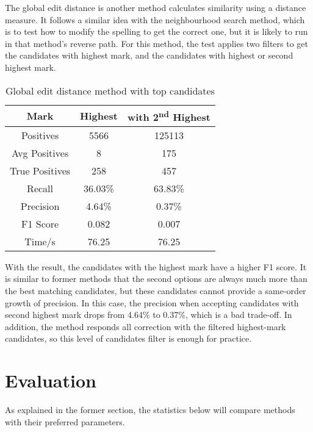 \documentclass[11pt]{article}
\begin{document}
The global edit distance is another method calculates similarity using a distance measure. It follows a similar idea with the neighbourhood search method, which is to test how to modify the spelling to get the correct one, but it is likely to run in that method's reverse path. For this method, the test applies two filters to get the candidates with highest mark, and the candidates with highest or second highest mark.

\begin{table}[h]
 \begin{center}
\begin{tabular}{ |c||c|c| }
      \hline
      Mark & Highest & with 2\textsuperscript{nd} Highest \\
      \hline
      Positives & 5566 & 125113\\
      Avg Positives & 8 & 175\\
      True Positives & 258 & 457\\
      Recall & 36.03\% & 63.83\%\\
      Precision & 4.64\% & 0.37\%\\
      F1 Score & 0.082 & 0.007\\
      Time/s & 76.25 & 76.25\\
      \hline
\end{tabular}
\caption{Global edit distance method with top candidates}\label{table4}
 \end{center}
\end{table}

With the result, the candidates with the highest mark have a higher F1 score. It is similar to former methods that the second options are always much more than the best matching candidates, but these candidates cannot provide a same-order growth of precision. In this case, the precision when accepting candidates with second highest mark drops from 4.64\% to 0.37\%, which is a bad trade-off. In addition, the method responds all correction with the filtered highest-mark candidates, so this level of candidates filter is enough for practice.

\section{Evaluation}
As explained in the former section, the statistics below will compare methods with their preferred parameters.
 
\end{document}
